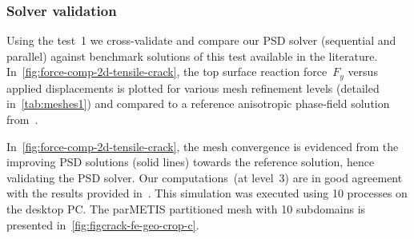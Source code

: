\subsubsection{Solver validation \label{sec:solver-validation}}
Using the test~1 we cross-validate and compare our PSD solver (sequential and parallel) against benchmark solutions of this test available in the literature. 
In~\cref{fig:force-comp-2d-tensile-crack}, the top surface reaction force~$F_y$ versus applied displacements is plotted for various mesh refinement levels (detailed in~\cref{tab:meshes1}) and compared to a reference anisotropic phase-field solution from~\cite{amor2009regularized}.

In~\cref{fig:force-comp-2d-tensile-crack}, the mesh convergence is evidenced from the improving PSD solutions (solid lines) towards the reference solution, hence validating  the PSD solver. 
Our computations~(at level~3) are in good agreement with the results provided in~\cite{amor2009regularized}. This simulation was executed using 10 processes on the desktop PC. The parMETIS partitioned mesh with 10 subdomains is presented in~\cref{fig:figcrack-fe-geo-crop-c}.    

